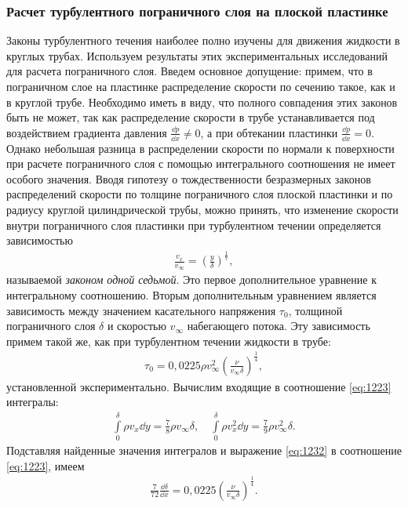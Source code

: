 	\subsubsection{Расчет турбулентного пограничного слоя на плоской пластинке}
	Законы турбулентного течения наиболее полно изучены для движения жидкости в круглых трубах. Используем результаты этих экспериментальных исследований для расчета пограничного слоя. Введем основное допущение: примем, что в пограничном слое на пластинке распределение скорости по сечению такое, как и в круглой трубе.\n
	Необходимо иметь в виду, что полного совпадения этих законов быть не может, так как распределение скорости в трубе устанавливается под воздействием градиента давления $\frac{\dd p}{\dd x} \ne 0$, а при обтекании пластинки $\frac{\dd p}{\dd x} = 0$. Однако небольшая разница в распределении скорости по нормали к поверхности при расчете пограничного слоя с помощью интегрального соотношения не имеет особого значения.\n
	Вводя гипотезу о тождественности безразмерных законов распределений скорости по толщине пограничного слоя плоской пластинки и по радиусу круглой цилиндрической трубы, можно принять, что изменение скорости внутри пограничного слоя пластинки при турбулентном течении определяется зависимостью
	\begin{gather}\label{eq:1231}
		\frac{v_x}{v_\infty} = \left(\frac{y}{\delta}\right)^\frac{1}{7},
	\end{gather}
	называемой \textit{законом одной седьмой}. Это первое дополнительное уравнение к интегральному соотношению.\n
	Вторым дополнительным уравнением является зависимость между значением касательного напряжения $\tau_0$, толщиной пограничного слоя $\delta$ и скоростью $v_\infty$ набегающего потока. Эту зависимость примем такой же, как при турбулентном течении жидкости в трубе:
	\begin{gather}\label{eq:1232}
		\tau_0 = 0,0225\rho v_\infty^2\left(\frac{\nu}{v_\infty\delta}\right)^\frac{1}{4},
	\end{gather}
	установленной экспериментально.\n
	Вычислим входящие в соотношение \eqref{eq:1223} интегралы:
	\begin{gather*}
		\int\limits_0^\delta\rho v_x\dd y = \frac{7}{8}\rho v_\infty\delta, \quad
		\int\limits_0^\delta\rho v_x^2\dd y = \frac{7}{9}\rho v_\infty^2\delta.
	\end{gather*}
	Подставляя найденные значения интегралов и выражение \eqref{eq:1232} в соотношение \eqref{eq:1223}, имеем
	\begin{gather*}
		\frac{7}{72}\frac{\dd\delta}{\dd x} = 0,0225\left(\frac{\nu}{v_\infty\delta}\right)^\frac{1}{4}.
	\end{gather*}\n
